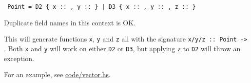 \texttt{ Point = D2 \{ x :: , y ::  \} | D3 \{ x :: , y :: , z ::  \}}

Duplicate field names in this context is OK.

This will generate functions \texttt{x}, \texttt{y} and \texttt{z} all with the signature \texttt{x/y/z :: Point -> }. Both \texttt{x} and \texttt{y} will work on either \texttt{D2} or \texttt{D3}, but applying \texttt{z} to \texttt{D2} will throw an exception.

For an example, see \url{code/vector.hs}.